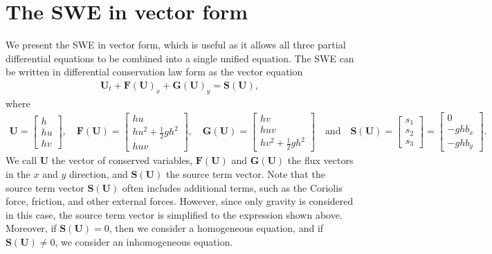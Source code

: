 \section{The SWE in vector form}
We present the SWE in vector form, which is useful as it allows all three partial differential equations to be combined into a single unified equation.
The SWE can be written in differential conservation law form as the vector equation
\begin{align}\label{eq:vector_form_2D}
    \mathbf{U}_t + \mathbf{F(U)}_x + \mathbf{G(U)}_y = \mathbf{S(U)},
\end{align}
where 
\begin{align*}
    \mathbf{U} = \begin{bmatrix}
        h \\
        hu \\
        hv
    \end{bmatrix},
    \quad 
    \mathbf{F(U)} = \begin{bmatrix}
        hu \\
        hu^2 + \frac{1}{2}gh^2 \\
        huv
    \end{bmatrix},
    \quad
    \mathbf{G(U)} = \begin{bmatrix}
        hv \\
        huv \\
        hv^2 + \frac{1}{2}gh^2
    \end{bmatrix}
    \quad \text{and} \quad
    \mathbf{S(U)} = \begin{bmatrix}
        s_1 \\
        s_2 \\
        s_3
    \end{bmatrix} = 
    \begin{bmatrix}
        0 \\
        -gh b_x \\
        -gh b_y
    \end{bmatrix}
    .
\end{align*}
We call $\mathbf{U}$ the vector of conserved variables, $\mathbf{F(U)}$ and $\mathbf{G(U)}$ the flux vectors in the $x$ and $y$ direction, and $\mathbf{S(U)}$ the source term vector.
Note that the source term vector $\mathbf{S(U)}$ often includes additional terms, such as the Coriolis force, friction, and other external forces.
However, since only gravity is considered in this case, the source term vector is simplified to the expression shown above.
Moreover, if $\mathbf{S(U)} = 0$, then we consider a homogeneous equation, and if $\mathbf{S(U)} \neq 0$, we consider an inhomogeneous equation.

